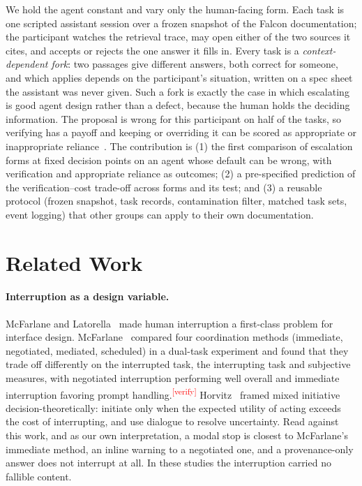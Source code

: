 \documentclass[sigconf,nonacm]{acmart}
\newcommand{\verify}{\textsuperscript{\textcolor{red}{[verify]}}}
\begin{document}
We hold the agent constant and vary only the human-facing form. Each task
is one scripted assistant session over a frozen snapshot of the Falcon
documentation; the participant watches the retrieval trace, may open
either of the two sources it cites, and accepts or rejects the one answer
it fills in. Every task is a \emph{context-dependent fork}: two passages
give different answers, both correct for someone, and which applies
depends on the participant's situation, written on a spec sheet the
assistant was never given. Such a fork is exactly the case in which
escalating is good agent design rather than a defect, because the human
holds the deciding information. The proposal is wrong for this
participant on half of the tasks, so verifying has a payoff and keeping
or overriding it can be scored as appropriate or inappropriate
reliance~\cite{schemmer2023}. The contribution is (1) the
first comparison of escalation forms at fixed decision points on an agent
whose default can be wrong, with verification and appropriate reliance as
outcomes; (2) a pre-specified prediction of the verification--cost
trade-off across forms and its test; and (3) a reusable protocol (frozen
snapshot, task records, contamination filter, matched task sets, event
logging) that other groups can apply to their own documentation.

\section{Related Work}
\label{sec:related}

\paragraph{Interruption as a design variable.}
McFarlane and Latorella~\cite{mcfarlane2002scope} made human interruption
a first-class problem for interface design.
McFarlane~\cite{mcfarlane2002comparison} compared four coordination
methods (immediate, negotiated, mediated, scheduled) in a dual-task
experiment and found that they trade off differently on the interrupted
task, the interrupting task and subjective measures, with negotiated
interruption performing well overall and immediate interruption favoring
prompt handling.\verify{}
Horvitz~\cite{horvitz1999} framed mixed initiative decision-theoretically:
initiate only when the expected utility of acting exceeds the cost of
interrupting, and use dialogue to resolve uncertainty. Read against this
work, and as our own interpretation, a modal stop is closest to
McFarlane's immediate method, an inline warning to a negotiated one, and a
provenance-only answer does not interrupt at all. In these studies the
interruption carried no fallible content.
\end{document}
